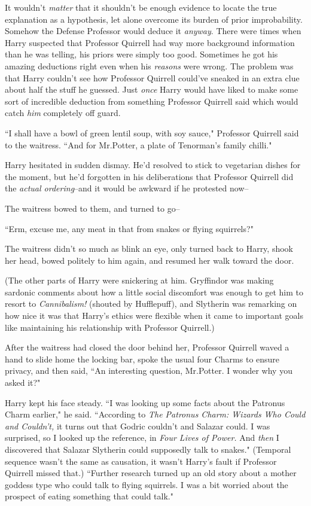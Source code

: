 It wouldn't \emph{matter} that it shouldn't be enough evidence to locate the true explanation as a hypothesis, let alone overcome its burden of prior improbability. Somehow the Defense Professor would deduce it \emph{anyway}. There were times when Harry suspected that Professor Quirrell had way more background information than he was telling, his priors were simply too good. Sometimes he got his amazing deductions right even when his \emph{reasons} were wrong. The problem was that Harry couldn't see how Professor Quirrell could've sneaked in an extra clue about half the stuff he guessed. Just \emph{once} Harry would have liked to make some sort of incredible deduction from something Professor Quirrell said which would catch \emph{him} completely off guard.

\later

``I shall have a bowl of green lentil soup, with soy sauce," Professor Quirrell said to the waitress. ``And for Mr.\?Potter, a plate of Tenorman's family chilli."

Harry hesitated in sudden dismay. He'd resolved to stick to vegetarian dishes for the moment, but he'd forgotten in his deliberations that Professor Quirrell did the \emph{actual ordering}\---and it would be awkward if he protested now\---

The waitress bowed to them, and turned to go\---

``Erm, excuse me, any meat in that from snakes or flying squirrels?"

The waitress didn't so much as blink an eye, only turned back to Harry, shook her head, bowed politely to him again, and resumed her walk toward the door.

(The other parts of Harry were snickering at him. Gryffindor was making sardonic comments about how a little social discomfort was enough to get him to resort to \emph{Cannibalism!} (shouted by Hufflepuff), and Slytherin was remarking on how nice it was that Harry's ethics were flexible when it came to important goals like maintaining his relationship with Professor Quirrell.)

After the waitress had closed the door behind her, Professor Quirrell waved a hand to slide home the locking bar, spoke the usual four Charms to ensure privacy, and then said, ``An interesting question, Mr.\?Potter. I wonder why you asked it?"

Harry kept his face steady. ``I was looking up some facts about the Patronus Charm earlier," he said. ``According to \emph{The Patronus Charm: Wizards Who Could and Couldn't,} it turns out that Godric couldn't and Salazar could. I was surprised, so I looked up the reference, in \emph{Four Lives of Power.} And \emph{then} I discovered that Salazar Slytherin could supposedly talk to snakes." (Temporal sequence wasn't the same as causation, it wasn't Harry's fault if Professor Quirrell missed that.) ``Further research turned up an old story about a mother goddess type who could talk to flying squirrels. I was a bit worried about the prospect of eating something that could talk."

